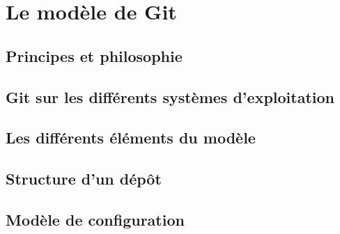 \section{Le modèle de Git} %

\subsection{Principes et philosophie} %

\subsection{Git sur les différents systèmes d'exploitation}\label{GitOS} %

\subsection{Les différents éléments du modèle} %



\subsection{Structure d'un dépôt} %

\subsection{Modèle de configuration} %
